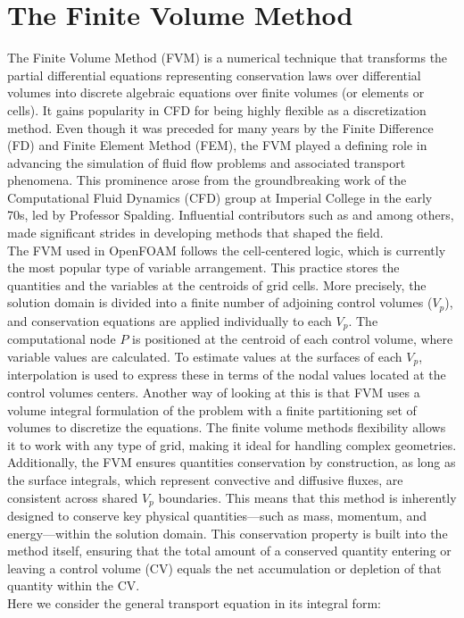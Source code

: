 \documentclass[a5paper]{sapthesis}
\begin{document}
	\section{The Finite Volume Method}
	
	The Finite Volume Method (FVM)\citep{ferziger2019computational} is a numerical technique that transforms the
	partial differential equations representing conservation laws over differential volumes into discrete algebraic equations over ﬁnite volumes (or elements or cells).
 	It gains popularity in CFD for being highly flexible as a discretization method. Even though it was preceded for many years by the Finite Difference (FD)\cite{crank1947practical} and Finite Element Method (FEM)\cite{clough1990original}, the FVM played a defining role in advancing the simulation of fluid flow problems and associated transport phenomena. This prominence arose from the groundbreaking work of the Computational Fluid Dynamics (CFD) group at Imperial College in the early 70s, led by Professor Spalding. Influential contributors such as \citet{gosman1969heat} and \citet{runchal1969numerical} among others, made significant strides in developing methods that shaped the field. 
	\\
	The FVM used in OpenFOAM follows the cell-centered logic, which is currently the most popular type of variable arrangement. This practice stores the quantities and the variables at the centroids of grid cells. More precisely, the solution domain is divided into a finite number of adjoining control volumes ($V_{p}$), and conservation equations are applied individually to each $V_{p}$. The computational node $P$ is positioned at the centroid of each control volume, where variable values are calculated. To estimate values at the surfaces of each $V_{p}$, interpolation is used to express these in terms of the nodal values located at the control volumes centers. Another way of looking at this is that FVM uses a volume integral formulation of the problem with a finite partitioning set of volumes to discretize the equations. The finite volume methods flexibility allows it to work with any type of grid, making it ideal for handling complex geometries. Additionally, the FVM ensures quantities conservation by construction, as long as the surface integrals, which represent convective and diffusive fluxes, are consistent across shared $V_{p}$ boundaries. This means that this method is inherently designed to conserve key physical quantities—such as mass, momentum, and energy—within the solution domain. This conservation property is built into the method itself, ensuring that the total amount of a conserved quantity entering or leaving a control volume (CV) equals the net accumulation or depletion of that quantity within the CV. \\
	Here we consider the general transport equation in its integral form:
	
\end{document}
